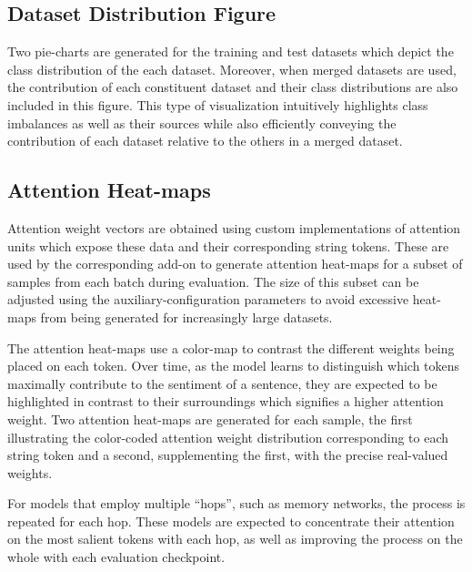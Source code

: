\documentclass[../../fyp.tex]{subfiles}
\begin{document}
\subsection{Dataset Distribution Figure}
Two pie-charts are generated for the training and test datasets which depict the class distribution of the each dataset. Moreover, when merged datasets are used, the contribution of each constituent dataset and their class distributions are also included in this figure. This type of visualization intuitively highlights class imbalances as well as their sources while also efficiently conveying the contribution of each dataset relative to the others in a merged dataset.

\subsection{Attention Heat-maps}
Attention weight vectors are obtained using custom implementations of attention units which expose these data and their corresponding string tokens. These are used by the corresponding add-on to generate attention heat-maps for a subset of samples from each batch during evaluation. The size of this subset can be adjusted using the auxiliary-configuration parameters to avoid excessive heat-maps from being generated for increasingly large datasets. 

The attention heat-maps use a color-map to contrast the different weights being placed on each token. Over time, as the model learns to distinguish which tokens maximally contribute to the sentiment of a sentence, they are expected to be highlighted in contrast to their surroundings which signifies a higher attention weight. Two attention heat-maps are generated for each sample, the first illustrating the color-coded attention weight distribution corresponding to each string token and a second, supplementing the first, with the precise real-valued weights.

For models that employ multiple \enquote{hops}, such as memory networks, the process is repeated for each hop. These models are expected to concentrate their attention on the most salient tokens with each hop, as well as improving the process on the whole with each evaluation checkpoint.
\end{document}

